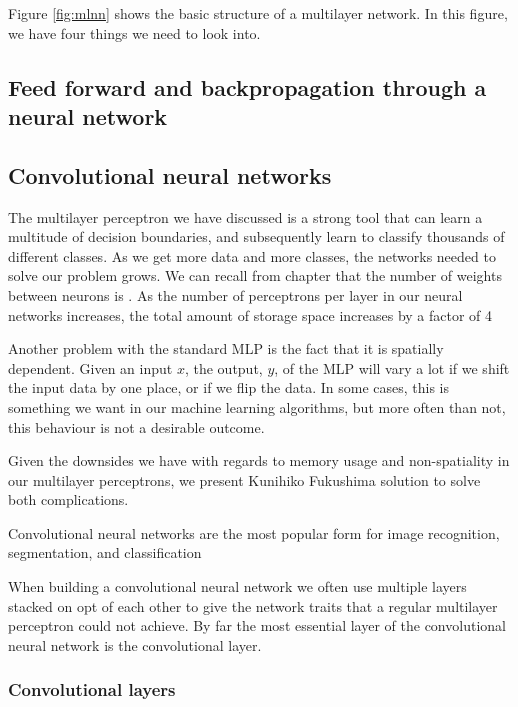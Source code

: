 Figure \ref{fig:mlnn} shows the basic structure of a multilayer network.
In this figure, we have four things we need to look into.

\subsection{Feed forward and backpropagation through a neural network}





    
\subsection{Convolutional neural networks}
The multilayer perceptron we have discussed is a strong tool that can learn a multitude of decision boundaries, and subsequently learn to classify thousands of different classes. 
As we get more data and more classes, the networks needed to solve our problem grows. We can recall from chapter  that the number of weights between neurons is . As the number of perceptrons per layer in our neural networks increases, the total amount of storage space increases by a factor of 4 

Another problem with the standard MLP is the fact that it is spatially dependent. Given an input $x$, the output, $y$, of the MLP will vary a lot if we shift the input data by one place, or if we flip the data. In some cases, this is something we want in our machine learning algorithms, but more often than not, this behaviour is not a desirable outcome.

Given the downsides we have with regards to memory usage and non-spatiality in our multilayer perceptrons, we present Kunihiko Fukushima  solution to solve both complications.

Convolutional neural networks are the most popular form for image recognition, segmentation, and classification 

When building a convolutional neural network we often use multiple layers stacked on opt of each other to give the network traits that a regular multilayer perceptron could not achieve. By far the most essential layer of the convolutional neural network is the convolutional layer.


\subsubsection{Convolutional layers}

